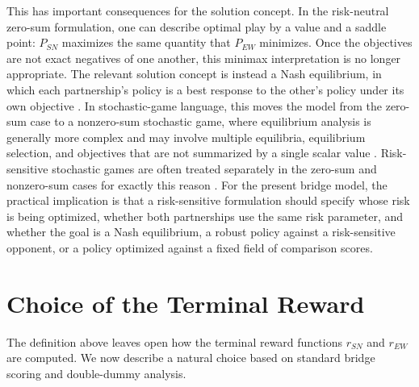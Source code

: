 \documentclass[11pt]{article}
\begin{document}
This has important consequences for the solution concept. In the risk-neutral zero-sum formulation, one can describe optimal play by a value and a saddle point: $P_{SN}$ maximizes the same quantity that $P_{EW}$ minimizes. Once the objectives are not exact negatives of one another, this minimax interpretation is no longer appropriate. The relevant solution concept is instead a Nash equilibrium, in which each partnership's policy is a best response to the other's policy under its own objective \cite{nash1951noncooperative}. In stochastic-game language, this moves the model from the zero-sum case to a nonzero-sum stochastic game, where equilibrium analysis is generally more complex and may involve multiple equilibria, equilibrium selection, and objectives that are not summarized by a single scalar value \cite{filar1997competitive}. Risk-sensitive stochastic games are often treated separately in the zero-sum and nonzero-sum cases for exactly this reason \cite{bauerle2017zerosum,basu2018nonzero}. For the present bridge model, the practical implication is that a risk-sensitive formulation should specify whose risk is being optimized, whether both partnerships use the same risk parameter, and whether the goal is a Nash equilibrium, a robust policy against a risk-sensitive opponent, or a policy optimized against a fixed field of comparison scores.

\section{Choice of the Terminal Reward}

The definition above leaves open how the terminal reward functions $r_{SN}$ and $r_{EW}$ are computed. We now describe a natural choice based on standard bridge scoring and double-dummy analysis.
\end{document}
